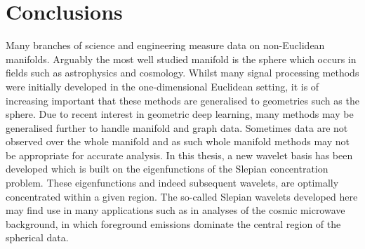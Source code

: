 \chapter{Conclusions}\label{sec:chapter6}

Many branches of science and engineering measure data on non-Euclidean manifolds.
Arguably the most well studied manifold is the sphere which occurs in fields such as astrophysics and cosmology.
Whilst many signal processing methods were initially developed in the one-dimensional Euclidean setting, it is of increasing important that these methods are generalised to geometries such as the sphere.
Due to recent interest in geometric deep learning, many methods may be generalised further to handle manifold and graph data.
Sometimes data are not observed over the whole manifold and as such whole manifold methods may not be appropriate for accurate analysis.
In this thesis, a new wavelet basis has been developed which is built on the eigenfunctions of the Slepian concentration problem.
These eigenfunctions and indeed subsequent wavelets, are optimally concentrated within a given region.
The so-called Slepian wavelets developed here may find use in many applications such as in analyses of the cosmic microwave background, in which foreground emissions dominate the central region of the spherical data.
